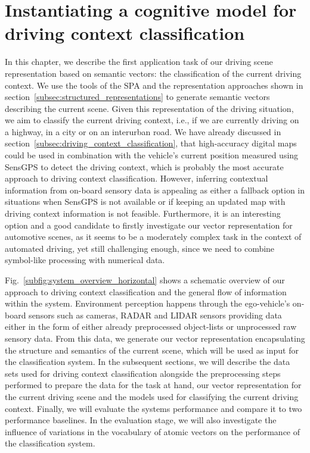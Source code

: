 \chapter{Instantiating a cognitive model for driving context classification}
\label{chap:driving_context_classification}

In this chapter, we describe the first application task of our driving scene representation based on semantic vectors: the classification of the current driving context.
We use the tools of the \ac{SPA} and the representation approaches shown in section~\ref{subsec:structured_representations} to generate semantic vectors describing the current scene.
Given this representation of the driving situation, we aim to classify the current driving context, i.e., if we are currently driving on a highway, in a city or on an interurban road.
We have already discussed in section~\ref{subsec:driving_context_classification}, that high-accuracy digital maps could be used in combination with the vehicle's current position measured using \ac{SensGPS} to detect the driving context, which is probably the most accurate approach to driving context classification.
However, inferring contextual information from on-board sensory data is appealing as either a fallback option in situations when \ac{SensGPS} is not available or if keeping an updated map with driving context information is not feasible.
Furthermore, it is an interesting option and a good candidate to firstly investigate our vector representation for automotive scenes, as it seems to be a moderately complex task in the context of automated driving, yet still challenging enough, since we need to combine symbol-like processing with numerical data.

Fig.~\ref{subfig:system_overview_horizontal} shows a schematic overview of our approach to driving context classification  and the general flow of information within the system.
Environment perception happens through the ego-vehicle's on-board sensors such as cameras, \ac{RADAR} and \ac{LIDAR} sensors providing data either in the form of either already preprocessed object-lists or unprocessed raw sensory data.
From this data, we generate our vector representation encapsulating the structure and semantics of the current scene, which will be used as input for the classification system.
In the subsequent sections, we will describe the data sets used for driving context classification alongside the preprocessing steps performed to prepare the data for the task at hand, our vector representation for the current driving scene and the models used for classifying the current driving context.
Finally, we will evaluate the systems performance and compare it to two performance baselines.
In the evaluation stage, we will also investigate the influence of variations in the vocabulary of atomic vectors on the performance of the classification system.

